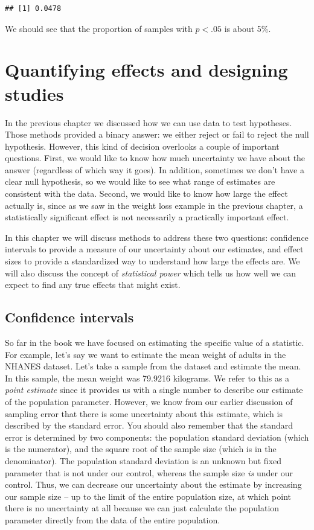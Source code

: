 \documentclass[12pt,]{book}
\begin{document}
\begin{verbatim}
## [1] 0.0478
\end{verbatim}

We should see that the proportion of samples with \(p < .05\) is about 5\%.

\hypertarget{ci-effect-size-power}{%
\chapter{Quantifying effects and designing studies}\label{ci-effect-size-power}}

In the previous chapter we discussed how we can use data to test hypotheses. Those methods provided a binary answer: we either reject or fail to reject the null hypothesis. However, this kind of decision overlooks a couple of important questions. First, we would like to know how much uncertainty we have about the answer (regardless of which way it goes). In addition, sometimes we don't have a clear null hypothesis, so we would like to see what range of estimates are consistent with the data. Second, we would like to know how large the effect actually is, since as we saw in the weight loss example in the previous chapter, a statistically significant effect is not necessarily a practically important effect.

In this chapter we will discuss methods to address these two questions: confidence intervals to provide a measure of our uncertainty about our estimates, and effect sizes to provide a standardized way to understand how large the effects are. We will also discuss the concept of \emph{statistical power} which tells us how well we can expect to find any true effects that might exist.

\hypertarget{confidence-intervals}{%
\section{Confidence intervals}\label{confidence-intervals}}

So far in the book we have focused on estimating the specific value of a statistic. For example, let's say we want to estimate the mean weight of adults in the NHANES dataset. Let's take a sample from the dataset and estimate the mean. In this sample, the mean weight was 79.9216 kilograms. We refer to this as a \emph{point estimate} since it provides us with a single number to describe our estimate of the population parameter. However, we know from our earlier discussion of sampling error that there is some uncertainty about this estimate, which is described by the standard error. You should also remember that the standard error is determined by two components: the population standard deviation (which is the numerator), and the square root of the sample size (which is in the denominator). The population standard deviation is an unknown but fixed parameter that is not under our control, whereas the sample size \emph{is} under our control. Thus, we can decrease our uncertainty about the estimate by increasing our sample size -- up to the limit of the entire population size, at which point there is no uncertainty at all because we can just calculate the population parameter directly from the data of the entire population.
\end{document}
